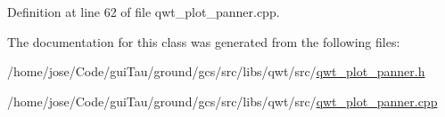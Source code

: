 Definition at line 62 of file qwt\-\_\-plot\-\_\-panner.\-cpp.



The documentation for this class was generated from the following files\-:\begin{DoxyCompactItemize}
\item 
/home/jose/\-Code/gui\-Tau/ground/gcs/src/libs/qwt/src/\hyperlink{qwt__plot__panner_8h}{qwt\-\_\-plot\-\_\-panner.\-h}\item 
/home/jose/\-Code/gui\-Tau/ground/gcs/src/libs/qwt/src/\hyperlink{qwt__plot__panner_8cpp}{qwt\-\_\-plot\-\_\-panner.\-cpp}\end{DoxyCompactItemize}

